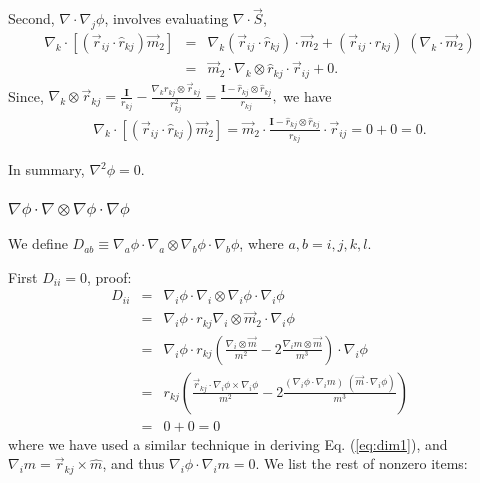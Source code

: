 \documentclass{article}
\begin{document}
Second, $\nabla \cdot \nabla_j \phi$, involves evaluating $\nabla \cdot \vec S$,
\begin{eqnarray*}
\nabla_k \cdot [ ( \vec r_{ij} \cdot \hat r_{kj}) \vec m_2]
&=& 
\nabla_k ( \vec r_{ij} \cdot \hat r_{kj}) \cdot \vec m_2
+
( \vec r_{ij} \cdot \hat r_{kj}) \; (\nabla_k \cdot \vec m_2) \\
&=& 
\vec m_2 \cdot \nabla_k \otimes \hat r_{kj} \cdot \vec r_{ij}
+ 0.
\end{eqnarray*}
%
Since,
$ \nabla_k \otimes \vec r_{kj} 
= \frac {\mathbf I} { r_{kj}}
- \frac { \nabla_k r_{kj} \otimes \vec r_{kj} }{ r_{kj}^2} 
= \frac { {\mathbf I - \hat r_{kj} \otimes \hat r_{kj}} } { r_{kj}},$
%
we have
\begin{eqnarray*}
\nabla_k \cdot [ ( \vec r_{ij} \cdot \hat r_{kj}) \vec m_2]
=
\vec m_2 \cdot \frac { {\mathbf I - \hat r_{kj} \otimes \hat r_{kj}} } { r_{kj}} \cdot \vec r_{ij} 
= 0 + 0 = 0.
\end{eqnarray*}

In summary, $\nabla^2 \phi = 0$.

\subsubsection{$\nabla \phi \cdot \nabla \otimes \nabla \phi \cdot \nabla \phi$}
We define 
$D_{ab} \equiv \nabla_a \phi \cdot \nabla_a \otimes \nabla_b \phi \cdot \nabla_b \phi$, 
where $a, b = i, j, k, l$.

First $D_{ii} = 0$, proof:
\begin{eqnarray*}
D_{ii} 
&=& \nabla_i \phi \cdot \nabla_i \otimes \nabla_i \phi \cdot \nabla_i \phi \\
&=& \nabla_i \phi \cdot r_{kj} \nabla_i \otimes \vec m_2 \cdot \nabla_i \phi \\
&=& \nabla_i \phi \cdot r_{kj} 
    \left(
    \frac {\nabla_i \otimes \vec m} {m^2}
    - 2 \frac{\nabla_i m \otimes \vec m}{m^3} 
    \right)
  \cdot \nabla_i \phi \\
&=& r_{kj} \left(
    \frac {\vec r_{kj} \cdot \nabla_i \phi \times \nabla_i \phi} {m^2}
    - 2 \frac{(\nabla_i \phi \cdot \nabla_i m) \; (\vec m \cdot \nabla_i \phi)}{m^3} 
    \right) \\
&=& 0 + 0 = 0
\end{eqnarray*}
where we have used a similar technique in deriving Eq. (\ref{eq:dim1}),
and $\nabla_i m = \vec r_{kj} \times \hat m$, 
and thus $\nabla_i \phi \cdot \nabla_i m = 0$.
We list the rest of nonzero items:
\end{document}
